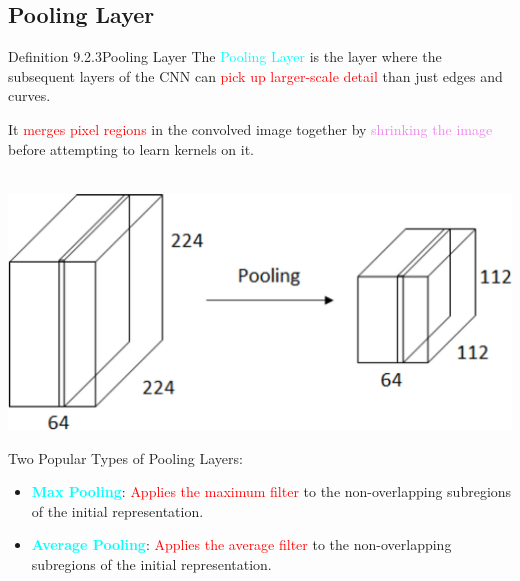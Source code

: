 \documentclass{book}
\begin{document}
\subsection{Pooling Layer}
\begin{defBox}{Definition 9.2.3}{Pooling Layer}
    The \textcolor{cyan}{Pooling Layer} is the layer where the subsequent layers of the CNN can \textcolor{red}{pick up larger-scale detail} than just edges and curves.
\end{defBox}
It \textcolor{red}{merges pixel regions} in the convolved image together by \textcolor{violet}{shrinking the image} before attempting to learn kernels on it.\\
\vspace{1mm}
\\
\begin{center}
    \includegraphics[scale=0.2]{chapter 9/ch9_figure8.jpeg}
\end{center}
\newpage
Two Popular Types of Pooling Layers:
\begin{itemize}
    \item \textcolor{cyan}{\textbf{Max Pooling}}: \textcolor{red}{Applies the maximum filter} to the non-overlapping subregions of the initial representation.
    \item \textcolor{cyan}{\textbf{Average Pooling}}: \textcolor{red}{Applies the average filter} to the non-overlapping subregions of the initial representation.
\end{itemize}
\end{document}
